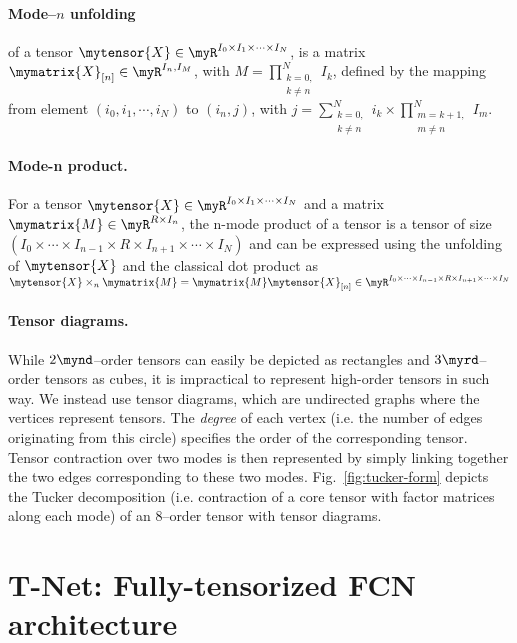 \documentclass[10pt,twocolumn,letterpaper]{article}
\begin{document}
\paragraph{Mode--\(n\) unfolding} of a tensor
	\( \mytensor{X} \in \myR^{I_0 \times I_1 \times \cdots \times I_N}\),
	is a matrix \(\mymatrix{X}_{[n]} \in \myR^{I_n, I_M}\), 
	with \(M = \prod_{\substack{k=0,\\k \neq n}}^N I_k\),
	defined by the mapping from element
	\( (i_0, i_1, \cdots, i_N)\) to \((i_n, j)\), with 
	\(
	j = \sum_{\substack{k=0,\\k \neq n}}^N i_k \times \prod_{\substack{m=k+1,\\ m \neq n}}^N I_m 
	\).
	

\paragraph{Mode-n product.}
For a tensor \(\mytensor{X} \in \myR^{I_0 \times I_1 \times \cdots \times I_N}\) and a matrix \( \mymatrix{M} \in \myR^{R \times I_n} \), the n-mode product of a tensor 
	is a tensor of size 
	\(\left(I_0 \times \cdots \times I_{n-1} \times R \times I_{n+1} \times \cdots \times I_N\right)\) 
	and can be expressed using the unfolding of \(\mytensor{X}\) 
	and the classical dot product as \(
		\mytensor{X} \times_n \mymatrix{M} = \mymatrix{M} \mytensor{X}_{[n]} \in \myR^{I_0 \times \cdots \times I_{n-1} \times R \times I_{n+1} \times \cdots \times I_N}\)


\paragraph{Tensor diagrams.} While \(2\mynd\)--order tensors can easily be depicted as rectangles and \(3\myrd\)--order tensors as cubes, it is impractical to represent high-order tensors in such way. We instead use tensor diagrams, which are undirected graphs where the vertices represent tensors. The \emph{degree} of each vertex (i.e. the number of edges originating from this circle) specifies the order of the corresponding tensor. Tensor contraction over two modes is then represented by simply linking together the two edges corresponding to these two modes. Fig.~\ref{fig:tucker-form} depicts the Tucker decomposition (i.e. contraction of a core tensor with factor matrices along each mode) of an 8\myth--order tensor with tensor diagrams.
 \section{T-Net: Fully-tensorized FCN architecture}\label{sec:method}
\end{document}
